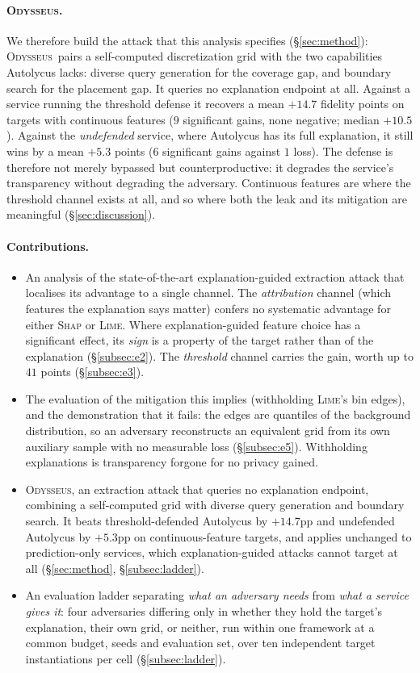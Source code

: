 \documentclass[sigconf,anonymous,review]{acmart}
\newcommand{\sys}{\textsc{Odysseus}}
\begin{document}
\paragraph{\sys.} We therefore build the attack that this analysis specifies (\S\ref{sec:method}):
\sys\ pairs a self-computed discretization grid with the two capabilities Autolycus lacks: diverse query generation for the coverage gap, and boundary search for the placement gap. It queries no
explanation endpoint at all. Against a service running the threshold defense it recovers
a mean $+14.7$ fidelity points on targets with continuous features ($9$ significant gains, none
negative; median $+10.5$). Against the \emph{undefended} service, where Autolycus has its full
explanation, it still wins by a mean $+5.3$ points ($6$ significant gains against $1$ loss). The defense is therefore not merely bypassed but counterproductive: it degrades the
service's transparency without degrading the adversary. Continuous features are where the threshold
channel exists at all, and so where both the leak and its mitigation are meaningful
(\S\ref{sec:discussion}).

\paragraph{Contributions.}
\begin{itemize}
  \item An analysis of the state-of-the-art explanation-guided extraction attack that localises its
  advantage to a single channel. The \emph{attribution} channel (which features the explanation says matter) confers no systematic advantage for either \textsc{Shap} or \textsc{Lime}. Where explanation-guided feature choice has a significant effect, its \emph{sign} is a property of the
  target rather than of the explanation (\S\ref{subsec:e2}). The \emph{threshold} channel carries the
  gain, worth up to $41$ points (\S\ref{subsec:e3}).
  \item The evaluation of the mitigation this implies (withholding \textsc{Lime}'s bin edges), and the demonstration that it fails: the edges are quantiles of the background distribution, so an
  adversary reconstructs an equivalent grid from its own auxiliary sample with no measurable loss
  (\S\ref{subsec:e5}). Withholding explanations is transparency forgone for no privacy gained.
  \item \sys, an extraction attack that queries no explanation endpoint, combining a self-computed
  grid with diverse query generation and boundary search. It beats threshold-defended Autolycus by
  $+14.7$pp and undefended Autolycus by $+5.3$pp on continuous-feature targets, and applies unchanged
  to prediction-only services, which explanation-guided attacks cannot target at all
  (\S\ref{sec:method}, \S\ref{subsec:ladder}).
  \item An evaluation ladder separating \emph{what an adversary needs} from \emph{what a service gives
  it}: four adversaries differing only in whether they hold the target's explanation, their own grid,
  or neither, run within one framework at a common budget, seeds and evaluation set, over ten
  independent target instantiations per cell (\S\ref{subsec:ladder}).
\end{itemize}
\end{document}
